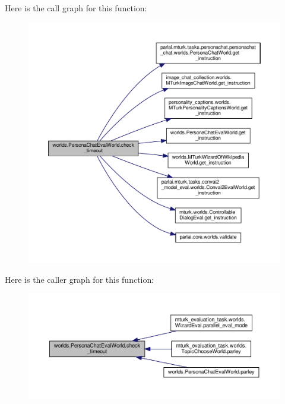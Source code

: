 Here is the call graph for this function\+:
\nopagebreak
\begin{figure}[H]
\begin{center}
\leavevmode
\includegraphics[width=350pt]{classworlds_1_1PersonaChatEvalWorld_a8c2ba6e0dc082cf9e53cfd70e2d71e4b_cgraph}
\end{center}
\end{figure}
Here is the caller graph for this function\+:
\nopagebreak
\begin{figure}[H]
\begin{center}
\leavevmode
\includegraphics[width=350pt]{classworlds_1_1PersonaChatEvalWorld_a8c2ba6e0dc082cf9e53cfd70e2d71e4b_icgraph}
\end{center}
\end{figure}
\mbox{\label{classworlds_1_1PersonaChatEvalWorld_a70142e8e89b6d07916c7e5d7428f9d0c}} 
